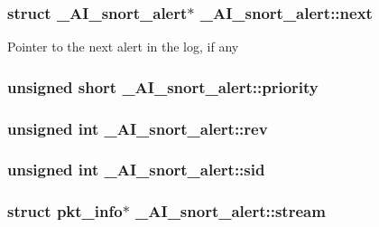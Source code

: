\label{struct__AI__snort__alert_a3c9bbe84ec696cd58668a45799a66600}
\hypertarget{struct__AI__snort__alert_aa8336d4b3359015ed8ea312ca1fd1173}{
\subsubsection[{next}]{\setlength{\rightskip}{0pt plus 5cm}struct {\bf \_\-AI\_\-snort\_\-alert}$\ast$ {\bf \_\-AI\_\-snort\_\-alert::next}}}
\label{struct__AI__snort__alert_aa8336d4b3359015ed8ea312ca1fd1173}
Pointer to the next alert in the log, if any \hypertarget{struct__AI__snort__alert_a25661fa4e212c5e30af5e6a892985ec9}{
\subsubsection[{priority}]{\setlength{\rightskip}{0pt plus 5cm}unsigned short {\bf \_\-AI\_\-snort\_\-alert::priority}}}
\label{struct__AI__snort__alert_a25661fa4e212c5e30af5e6a892985ec9}
\hypertarget{struct__AI__snort__alert_a864d3baa48586d6a31639f4cd27d9d37}{
\subsubsection[{rev}]{\setlength{\rightskip}{0pt plus 5cm}unsigned int {\bf \_\-AI\_\-snort\_\-alert::rev}}}
\label{struct__AI__snort__alert_a864d3baa48586d6a31639f4cd27d9d37}
\hypertarget{struct__AI__snort__alert_a3349aa68d2234f8ffd897367c3a8a137}{
\subsubsection[{sid}]{\setlength{\rightskip}{0pt plus 5cm}unsigned int {\bf \_\-AI\_\-snort\_\-alert::sid}}}
\label{struct__AI__snort__alert_a3349aa68d2234f8ffd897367c3a8a137}
\hypertarget{struct__AI__snort__alert_a09dfe0a841fd3912ec78060d4547cb31}{
\subsubsection[{stream}]{\setlength{\rightskip}{0pt plus 5cm}struct {\bf pkt\_\-info}$\ast$ {\bf \_\-AI\_\-snort\_\-alert::stream}}}
